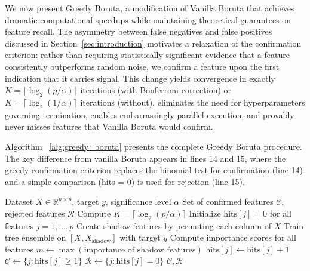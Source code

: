 \documentclass[runningheads]{llncs}
\begin{document}
We now present Greedy Boruta, a modification of Vanilla Boruta that achieves dramatic computational speedups while maintaining theoretical guarantees on feature recall. The asymmetry between false negatives and false positives discussed in Section~\ref{sec:introduction} motivates a relaxation of the confirmation criterion: rather than requiring statistically significant evidence that a feature consistently outperforms random noise, we confirm a feature upon the first indication that it carries signal. This change yields convergence in exactly $K = \lceil \log_2(p/\alpha) \rceil$ iterations (with Bonferroni correction) or $K = \lceil \log_2(1/\alpha) \rceil$ iterations (without), eliminates the need for hyperparameters governing termination, enables embarrassingly parallel execution, and provably never misses features that Vanilla Boruta would confirm.

Algorithm ~\ref{alg:greedy_boruta} presents the complete Greedy Boruta procedure. The key difference from vanilla Boruta appears in lines 14 and 15, where the greedy confirmation criterion replaces the binomial test for confirmation (line 14) and a simple comparison (hits = 0) is used for rejection (line 15).

\begin{algorithm}[t]
\caption{Greedy Boruta Algorithm}
\label{alg:greedy_boruta}
\begin{algorithmic}[1]
\REQUIRE Dataset $X \in \mathbb{R}^{n \times p}$, target $y$, significance level $\alpha$
\ENSURE Set of confirmed features $\mathcal{C}$, rejected features $\mathcal{R}$
\STATE Compute $K = \lceil \log_2(p/\alpha) \rceil$ 
\STATE Initialize $\text{hits}[j] = 0$ for all features $j = 1, \ldots, p$
    \STATE Create shadow features by permuting each column of $X$
    \STATE Train tree ensemble on $[X, X_{\text{shadow}}]$ with target $y$
    \STATE Compute importance scores for all features
    \STATE $m \gets \max(\text{importance of shadow features})$
            \STATE $\text{hits}[j] \gets \text{hits}[j] + 1$
        \ENDIF
    \ENDFOR
\ENDFOR
\STATE $\mathcal{C} \gets \{j : \text{hits}[j] \geq 1\}$ 
\STATE $\mathcal{R} \gets \{j : \text{hits}[j] = 0\}$  
\RETURN $\mathcal{C}, \mathcal{R}$
\end{algorithmic}
\end{algorithm}
\end{document}
